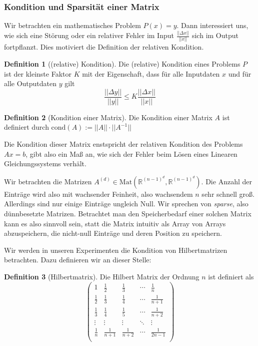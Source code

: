 \documentclass[smallheadings]{scrartcl}
\theoremstyle{definition}
\newtheorem{definition}{Definition}[section]
\begin{document}
		\subsubsection{Kondition und Sparsität einer Matrix}
		Wir betrachten ein mathematisches Problem $P(x)=y$. Dann interessiert uns, wie sich eine Störung oder ein relativer Fehler im Input $\frac{||\Delta x||}{||x||}$ sich im Output fortpflanzt. Dies motiviert die Definition der relativen Kondition.
				\begin{definition}[(relative) Kondition]
		Die (relative) Kondition eines Problems $P$ ist der kleinste Faktor $K$ mit der Eigenschaft, dass für alle Inputdaten $x$ und für alle Outputdaten $y$ gilt 
		$$\frac{||\Delta y||}{||y||}\leq K\frac{||\Delta x||}{||x||}$$
		\end{definition}
		\begin{definition}[Kondition einer Matrix]
		Die Kondition einer Matrix $A$ ist definiert durch $\text{cond}(A):=||A||\cdot ||A^{-1}||$
		\end{definition}
		Die Kondition dieser Matrix enstspricht der relativen Kondition des Problems $Ax=b$, gibt also ein Maß an, wie sich der Fehler beim Lösen eines Linearen Gleichungssystems verhält. 

		Wir betrachten die Matrizen $A^{(d)} \in \text{Mat}(\mathbb{R}^{(n-1)^d},\mathbb{R}^{(n-1)^d})$. Die Anzahl der Einträge wird also mit wachsender Feinheit, also wachsendem $n$ sehr schnell groß. Allerdings sind nur einige Einträge ungleich Null. Wir sprechen von \textit{sparse}, also dünnbesetzte Matrizen. Betrachtet man den Speicherbedarf einer solchen Matrix kann es also sinnvoll sein, statt die Matrix intuitiv als Array von Arrays abzuspeichern, die nicht-null Einträge und deren Position zu speichern. 

Wir werden in unseren Experimenten die Kondition von Hilbertmatrizen betrachten. Dazu definieren wir an dieser Stelle:
		\begin{definition}[Hilbertmatrix]
		Die Hilbert Matrix der Ordnung $n$ ist definiert als 
		$$\begin{pmatrix}
		1&\frac{1}{2}&\frac{1}{3}&\cdots & \frac{1}{n}\\
		\frac{1}{2}&\frac{1}{3}&\frac{1}{4}&\cdots &\frac{1}{n+1}\\
		\frac{1}{3}&\frac{1}{4}&\frac{1}{5}&\cdots &\frac{1}{n+2}\\
		\vdots &\vdots &\vdots &\ddots &\vdots\\
		\frac{1}{n}&\frac{1}{n+1}&\frac{1}{n+2}&\cdots &\frac{1}{2n-1}\\
		\end{pmatrix}$$
		\end{definition}
		
\end{document}
